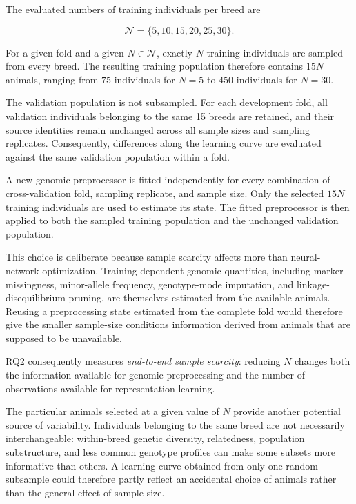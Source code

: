 The evaluated numbers of training individuals per breed are

\begin{equation}
    \mathcal{N}
    =
    \{5,10,15,20,25,30\}.
    \label{eq:sample_sizes}
\end{equation}

For a given fold and a given $N\in\mathcal{N}$, exactly $N$ training
individuals are sampled from every breed. The resulting training
population therefore contains $15N$ animals, ranging from $75$
individuals for $N=5$ to $450$ individuals for $N=30$.

The validation population is not subsampled. For each development
fold, all validation individuals belonging to the same 15 breeds are
retained, and their source identities remain unchanged across all
sample sizes and sampling replicates. Consequently, differences along
the learning curve are evaluated against the same validation
population within a fold.

A new genomic preprocessor is fitted independently for every
combination of cross-validation fold, sampling replicate, and sample size.
Only the selected $15N$ training individuals are used to estimate its
state. The fitted preprocessor is then applied to both the sampled
training population and the unchanged validation population.

This choice is deliberate because sample scarcity affects more than
neural-network optimization. Training-dependent genomic quantities,
including marker missingness, minor-allele frequency, genotype-mode
imputation, and linkage-disequilibrium pruning, are themselves
estimated from the available animals. Reusing a preprocessing state
estimated from the complete fold would therefore give the smaller
sample-size conditions information derived from animals that are
supposed to be unavailable.

RQ2 consequently measures \emph{end-to-end sample scarcity}: reducing
$N$ changes both the information available for genomic preprocessing
and the number of observations available for representation learning.

The particular animals selected at a given value of $N$ provide
another potential source of variability. Individuals belonging to the
same breed are not necessarily interchangeable: within-breed genetic
diversity, relatedness, population substructure, and less common
genotype profiles can make some subsets more informative than others.
A learning curve obtained from only one random subsample could
therefore partly reflect an accidental choice of animals rather than
the general effect of sample size.

